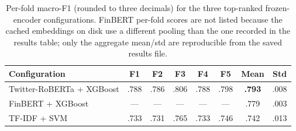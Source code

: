 \documentclass[12pt,a4paper]{article}
\begin{document}
\begin{table}[!htbp]
\centering
\small
\begin{tabular}{lccccccc}
\toprule
\textbf{Configuration} & \textbf{F1} & \textbf{F2} & \textbf{F3} & \textbf{F4} & \textbf{F5} & \textbf{Mean} & \textbf{Std} \\
\midrule
Twitter-RoBERTa + XGBoost  & .788 & .786 & .806 & .788 & .798 & \textbf{.793} & .008 \\
FinBERT + XGBoost          & ---  & ---  & ---  & ---  & ---  & .779          & .003 \\
TF-IDF + SVM               & .733 & .731 & .765 & .733 & .746 & .742          & .013 \\
\bottomrule
\end{tabular}
\caption{Per-fold macro-F1 (rounded to three decimals) for the three top-ranked frozen-encoder configurations. FinBERT per-fold scores are not listed because the cached embeddings on disk use a different pooling than the one recorded in the results table; only the aggregate mean/std are reproducible from the saved results file.}
\label{tab:cv_app}
\end{table}
\end{document}
